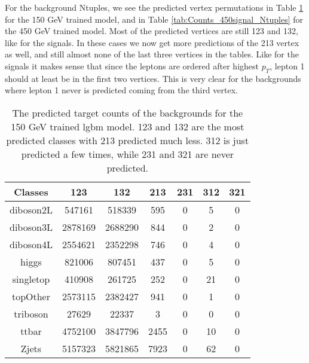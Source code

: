 \documentclass[a4paper, american, 12pt]{report}
\begin{document}
	For the background Ntuples, we see the predicted vertex permutations in Table \ref{tab:Counts_150_Ntuples} for the 150 GeV trained model, and in Table \ref{tab:Counts_450signal_Ntuples} for the 450 GeV trained model. Most of the predicted vertices are still 123 and 132, like for the signals. In these cases we now get more predictions of the 213 vertex as well, and still almost none of the last three vertices in the tables. Like for the signals it makes sense that since the leptons are ordered after highest $p_T$, lepton 1 should at least be in the first two vertices. This is very clear for the backgrounds where lepton 1 never is predicted coming from the third vertex.
	\begin{table}[htbp!]
		\centering
		\begin{tabular}{ |c|c|c|c|c|c|c| }
			\hline \rule{0pt}{13pt}
			Classes & 123 & 132 & 213 & 231 & 312 & 321 \\
			\hline \rule{0pt}{13pt}
			diboson2L & 547161 & 518339 & 595 & 0 & 5 & 0 \\
			\hline \rule{0pt}{13pt}
			diboson3L & 2878169 & 2688290 & 844 & 0 & 2 & 0 \\
			\hline \rule{0pt}{13pt}
			diboson4L & 2554621 & 2352298 & 746 & 0 & 4 & 0 \\
			\hline \rule{0pt}{13pt}
			higgs & 821006 & 807451 & 437 & 0 & 5 & 0 \\
			\hline \rule{0pt}{13pt}
			singletop & 410908 & 261725 & 252 & 0 & 21 & 0 \\
			\hline \rule{0pt}{13pt}
			topOther & 2573115 & 2382427 & 941 & 0 & 1 & 0 \\
			\hline \rule{0pt}{13pt}
			triboson & 27629 & 22337 & 3 & 0 & 0 & 0 \\
			\hline \rule{0pt}{13pt}
			ttbar & 4752100 & 3847796 & 2455 & 0 & 10 & 0 \\
			\hline \rule{0pt}{13pt}
			Zjets & 5157323 & 5821865 & 7923 & 0 & 62 & 0 \\
			\hline
		\end{tabular}	
		\caption[Target counts of backgrounds for 150 GeV trained classifier.]{The predicted target counts of the backgrounds for the 150 GeV trained \acrshort{lgbm} model. 123 and 132 are the most predicted classes with 213 predicted much less. 312 is just predicted a few times, while 231 and 321 are never predicted.}
		\label{tab:Counts_150_Ntuples}
	\end{table}
\end{document}

